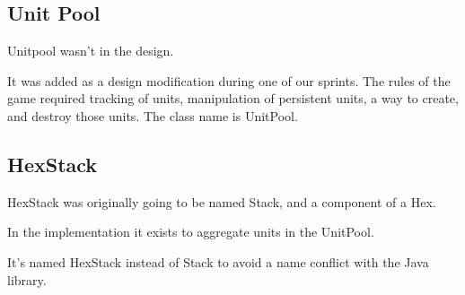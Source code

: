 \documentclass[12pt,a4paper]{article}
\begin{document}
\subsection{Unit Pool}
Unitpool wasn't in the design.

It was added as a design modification during one of our sprints. The rules of the game required tracking of units, manipulation of persistent units, a way to create, and destroy those units. The class name is UnitPool.

\subsection{HexStack}
HexStack was originally going to be named Stack, and a component of a Hex.

In the implementation it exists to aggregate units in the UnitPool.

It's named HexStack instead of Stack to avoid a name conflict with the Java library.
\end{document}
